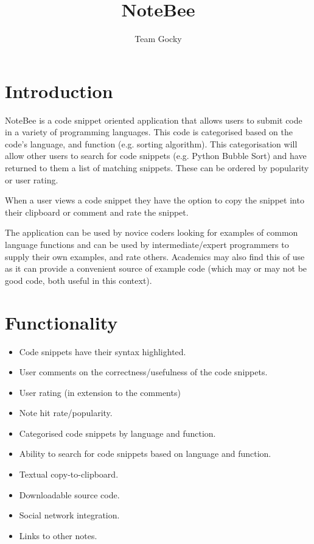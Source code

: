 \documentclass[11pt,a4paper]{article}
\title{NoteBee}
\author{Team Gocky}
\begin{document}
\maketitle

\tableofcontents

\section{Introduction}

NoteBee is a code snippet oriented application that allows users to submit code 
in a variety of programming languages. This code is categorised based on the
code's language, and function (e.g. sorting algorithm). This categorisation
will allow other users to search for code snippets (e.g. Python Bubble Sort)
and have returned to them a list of matching snippets. These can be ordered
by popularity or user rating.

When a user views a code snippet they have the option to copy the snippet into
their clipboard or comment and rate the snippet.

The application can be used by novice coders looking for examples of common
language functions and can be used by intermediate/expert programmers to supply
their own examples, and rate others. Academics may also find this of use as
it can provide a convenient source of example code (which may or may not be
good code, both useful in this context).

\section{Functionality}

\begin{itemize}
\item Code snippets have their syntax highlighted.
\item User comments on the correctness/usefulness of the code snippets.
\item User rating (in extension to the comments)
\item Note hit rate/popularity.
\item Categorised code snippets by language and function.
\item Ability to search for code snippets based on language and function.
\item Textual copy-to-clipboard.
\item Downloadable source code.
\item Social network integration.
\item Links to other notes.
\end{itemize}
\end{document}

